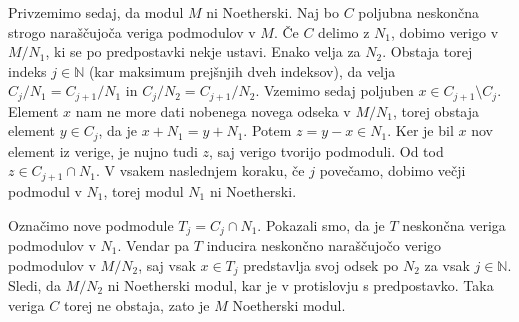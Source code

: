 \documentclass[a4paper, 12pt]{article}
\newcommand{\N}{\mathbb{N}}
\begin{document}
Privzemimo sedaj, da modul $M$ ni Noetherski. Naj bo $C$ poljubna neskončna strogo naraščujoča veriga podmodulov v $M$. Če $C$ delimo z $N_1$, dobimo verigo v $M/N_1$, ki se po predpostavki nekje ustavi. Enako velja za $N_2$. Obstaja torej indeks $j \in \N$ (kar maksimum prejšnjih dveh indeksov), da velja $C_j/N_1 = C_{j+1}/N_1$ in $C_j/N_2 = C_{j+1}/N_2$. Vzemimo sedaj poljuben $x \in C_{j+1}\setminus C_j$. Element $x$ nam ne more dati nobenega novega odseka v $M/N_1$, torej obstaja element $y \in C_j$, da je $x + N_1 = y + N_1$. Potem $z = y - x \in N_1$. Ker je bil $x$ nov element iz verige, je nujno tudi $z$, saj verigo tvorijo podmoduli. Od tod $z \in C_{j+1} \cap N_1$. V vsakem naslednjem koraku, če $j$ povečamo, dobimo večji podmodul v $N_1$, torej modul $N_1$ ni Noetherski.

Označimo nove podmodule $T_j = C_j \cap N_1$. Pokazali smo, da je $T$ neskončna veriga podmodulov v $N_1$. Vendar pa $T$ inducira neskončno naraščujočo verigo podmodulov v $M/N_2$, saj vsak $x \in T_j$ predstavlja svoj odsek po $N_2$ za vsak $j \in \N$.
Sledi, da $M/N_2$ ni Noetherski modul, kar je v protislovju s predpostavko. Taka veriga $C$ torej ne obstaja, zato je $M$ Noetherski modul.
\end{document}
